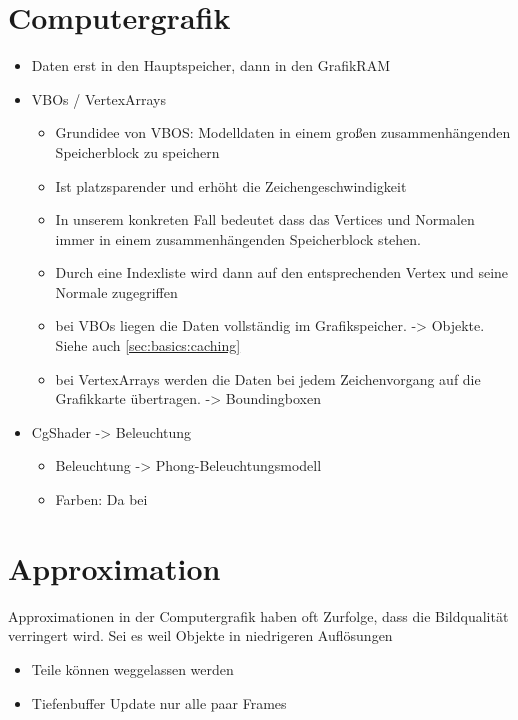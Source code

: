 \section{Computergrafik}
\label{sec:basics:computergrafik}

\begin{itemize}
 \item Daten erst in den Hauptspeicher, dann in den GrafikRAM
 \item VBOs / VertexArrays
 \begin{itemize}
  \item Grundidee von VBOS: Modelldaten in einem großen zusammenhängenden Speicherblock zu speichern
  \item Ist platzsparender und erhöht die Zeichengeschwindigkeit
  \item In unserem konkreten Fall bedeutet dass das Vertices und Normalen immer in einem zusammenhängenden Speicherblock stehen. 
  \item Durch eine Indexliste wird dann auf den entsprechenden Vertex und seine Normale zugegriffen
  \item bei VBOs liegen die Daten vollständig im Grafikspeicher. -> Objekte. Siehe auch \ref{sec:basics:caching}
  \item bei VertexArrays werden die Daten bei jedem Zeichenvorgang auf die Grafikkarte übertragen. -> Boundingboxen

 \end{itemize}
 \item CgShader -> Beleuchtung
 \begin{itemize}
  \item Beleuchtung -> Phong-Beleuchtungsmodell
  \item Farben: Da bei 
 \end{itemize}

\end{itemize}

\section{Approximation}
\label{sec:basics:approximation}
Approximationen in der Computergrafik haben oft  Zurfolge, dass die Bildqualität verringert wird. Sei es weil Objekte in niedrigeren Auflösungen
\begin{itemize}
 \item Teile können weggelassen werden
 \item Tiefenbuffer Update nur alle paar Frames
\end{itemize}

